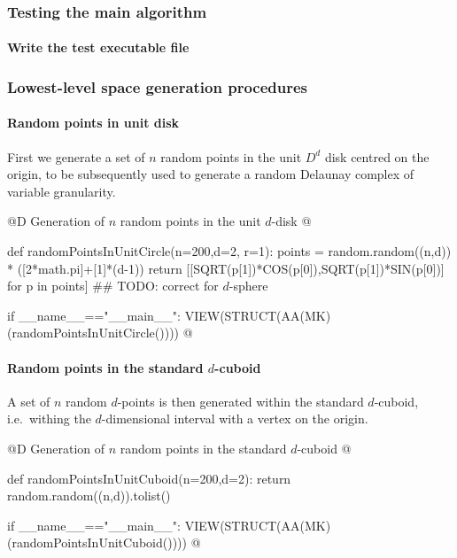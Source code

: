 \documentclass[11pt,oneside]{article}	%
\begin{document}
\subsubsection{Testing the main algorithm}

\paragraph{Write the test executable file}




\subsubsection{Lowest-level space generation procedures}

\paragraph{Random points in unit disk} 
First we generate a  set of $n$ random points in the unit $D^d$ disk centred on the origin, to be subsequently used to generate a random Delaunay complex of variable granularity.

@D Generation of $n$ random points in the unit $d$-disk 
@{def randomPointsInUnitCircle(n=200,d=2, r=1):
	points = random.random((n,d)) * ([2*math.pi]+[1]*(d-1))
	return [[SQRT(p[1])*COS(p[0]),SQRT(p[1])*SIN(p[0])] for p in points]
	## TODO: correct for $d$-sphere

if __name__=="__main__":
	VIEW(STRUCT(AA(MK)(randomPointsInUnitCircle()))) 
@}

\paragraph{Random points in the standard $d$-cuboid} 
A set of $n$ random $d$-points is then generated within the standard $d$-cuboid, i.e.~withing the $d$-dimensional interval with a vertex on the origin.

@D Generation of $n$ random points in the standard $d$-cuboid 
@{def randomPointsInUnitCuboid(n=200,d=2):
	return random.random((n,d)).tolist()

if __name__=="__main__":
	VIEW(STRUCT(AA(MK)(randomPointsInUnitCuboid()))) 
@}
\end{document}
